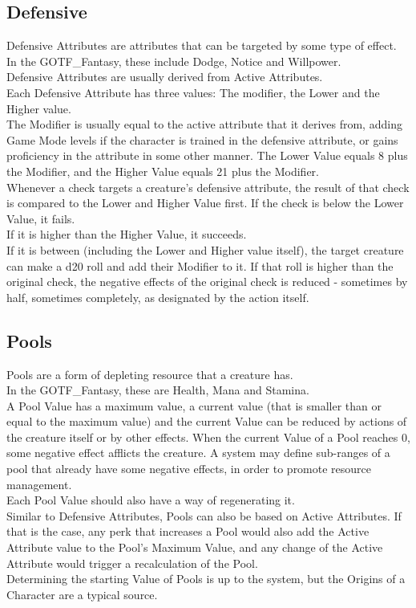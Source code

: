 \subsection{Defensive}\label{subsec:defensiveattributes}
Defensive Attributes are attributes that can be targeted by some type of effect.\\
In the GOTF\_Fantasy, these include Dodge, Notice and Willpower.\\
Defensive Attributes are usually derived from Active Attributes.\\
Each Defensive Attribute has three values: The modifier, the Lower and the Higher value.\\
The Modifier is usually equal to the active attribute that it derives from, adding Game Mode levels if the character is trained in the defensive attribute, or gains proficiency in the attribute in some other manner.
The Lower Value equals 8 plus the Modifier, and the Higher Value equals 21 plus the Modifier.\\
Whenever a check targets a creature's defensive attribute, the result of that check is compared to the Lower and Higher Value first.
If the check is below the Lower Value, it fails.\\
If it is higher than the Higher Value, it succeeds.\\
If it is between (including the Lower and Higher value itself), the target creature can make a d20 roll and add their Modifier to it.
If that roll is higher than the original check, the negative effects of the original check is reduced - sometimes by half, sometimes completely, as designated by the action itself.\\

\subsection{Pools}\label{subsec:poolattributes}
Pools are a form of depleting resource that a creature has.\\
In the GOTF\_Fantasy, these are Health, Mana and Stamina.\\
A Pool Value has a maximum value, a current value (that is smaller than or equal to the maximum value) and the current Value can be reduced by actions of the creature itself or by other effects.
When the current Value of a Pool reaches 0, some negative effect afflicts the creature.
A system may define sub-ranges of a pool that already have some negative effects, in order to promote resource management.\\
Each Pool Value should also have a way of regenerating it.\\
Similar to Defensive Attributes, Pools can also be based on Active Attributes.
If that is the case, any perk that increases a Pool would also add the Active Attribute value to the Pool's Maximum Value, and any change of the Active Attribute would trigger a recalculation of the Pool.\\
Determining the starting Value of Pools is up to the system, but the Origins of a Character are a typical source.\\

